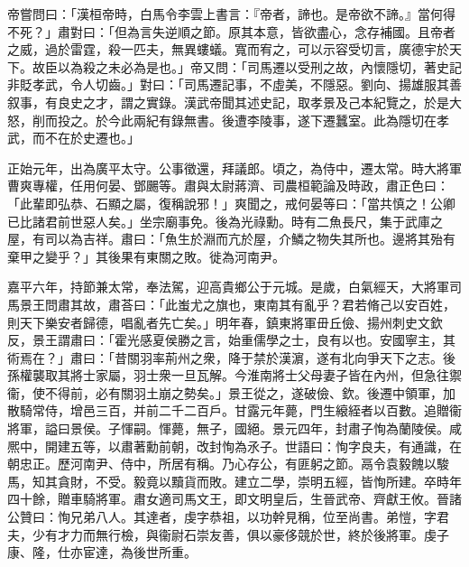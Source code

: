 \begin{pinyinscope}
帝嘗問曰：「漢桓帝時，白馬令李雲上書言：『帝者，諦也。是帝欲不諦。』當何得不死？」肅對曰：「但為言失逆順之節。原其本意，皆欲盡心，念存補國。且帝者之威，過於雷霆，殺一匹夫，無異螻蟻。寬而宥之，可以示容受切言，廣德宇於天下。故臣以為殺之未必為是也。」帝又問：「司馬遷以受刑之故，內懷隱切，著史記非貶孝武，令人切齒。」對曰：「司馬遷記事，不虛美，不隱惡。劉向、揚雄服其善叙事，有良史之才，謂之實錄。漢武帝聞其述史記，取孝景及己本紀覽之，於是大怒，削而投之。於今此兩紀有錄無書。後遭李陵事，遂下遷蠶室。此為隱切在孝武，而不在於史遷也。」

正始元年，出為廣平太守。公事徵還，拜議郎。頃之，為侍中，遷太常。時大將軍曹爽專權，任用何晏、鄧颺等。肅與太尉蔣濟、司農桓範論及時政，肅正色曰：「此輩即弘恭、石顯之屬，復稱說邪！」爽聞之，戒何晏等曰：「當共慎之！公卿已比諸君前世惡人矣。」坐宗廟事免。後為光祿勳。時有二魚長尺，集于武庫之屋，有司以為吉祥。肅曰：「魚生於淵而亢於屋，介鱗之物失其所也。邊將其殆有棄甲之變乎？」其後果有東關之敗。徙為河南尹。

嘉平六年，持節兼太常，奉法駕，迎高貴鄉公于元城。是歲，白氣經天，大將軍司馬景王問肅其故，肅荅曰：「此蚩尤之旗也，東南其有亂乎？君若脩己以安百姓，則天下樂安者歸德，唱亂者先亡矣。」明年春，鎮東將軍毌丘儉、揚州刺史文欽反，景王謂肅曰：「霍光感夏侯勝之言，始重儒學之士，良有以也。安國寧主，其術焉在？」肅曰：「昔關羽率荊州之衆，降于禁於漢濵，遂有北向爭天下之志。後孫權襲取其將士家屬，羽士衆一旦瓦解。今淮南將士父母妻子皆在內州，但急往禦衞，使不得前，必有關羽土崩之勢矣。」景王從之，遂破儉、欽。後遷中領軍，加散騎常侍，增邑三百，并前二千二百戶。甘露元年薨，門生縗絰者以百數。追贈衞將軍，謚曰景侯。子惲嗣。惲薨，無子，國絕。景元四年，封肅子恂為蘭陵侯。咸熈中，開建五等，以肅著勳前朝，改封恂為氶子。世語曰：恂字良夫，有通識，在朝忠正。歷河南尹、侍中，所居有稱。乃心存公，有匪躬之節。鬲令袁毅餽以駿馬，知其貪財，不受。毅竟以黷貨而敗。建立二學，崇明五經，皆恂所建。卒時年四十餘，贈車騎將軍。肅女適司馬文王，即文明皇后，生晉武帝、齊獻王攸。晉諸公贊曰：恂兄弟八人。其達者，虔字恭祖，以功幹見稱，位至尚書。弟愷，字君夫，少有才力而無行檢，與衞尉石崇友善，俱以豪侈競於世，終於後將軍。虔子康、隆，仕亦宦達，為後世所重。


\end{pinyinscope}
